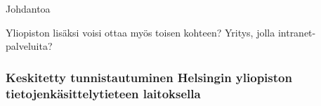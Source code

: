 Johdantoa

Yliopiston lisäksi voisi ottaa myös toisen kohteen? Yritys, jolla intranet-palveluita?

\subsubsection{Keskitetty tunnistautuminen Helsingin yliopiston tietojenkäsittelytieteen laitoksella}
